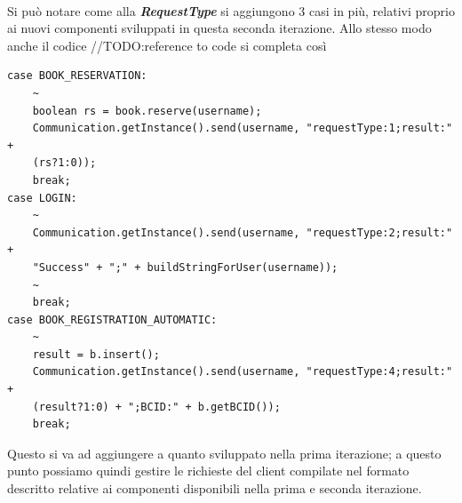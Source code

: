 \\ \noindent
Si può notare come alla \textbf{\textit{RequestType}} si aggiungono 3 casi in più, relativi proprio ai nuovi componenti sviluppati in questa seconda iterazione. Allo stesso modo anche il codice //TODO:reference to code si completa così
\begin{lstlisting}
case BOOK_RESERVATION:
	~
	boolean rs = book.reserve(username);
	Communication.getInstance().send(username, "requestType:1;result:" + 
	(rs?1:0));
	break;
case LOGIN:
	~
	Communication.getInstance().send(username, "requestType:2;result:" + 
	"Success" + ";" + buildStringForUser(username));
	~
	break;
case BOOK_REGISTRATION_AUTOMATIC:
	~
	result = b.insert();
	Communication.getInstance().send(username, "requestType:4;result:" + 
	(result?1:0) + ";BCID:" + b.getBCID());
	break;
\end{lstlisting}
Questo si va ad aggiungere a quanto sviluppato nella prima iterazione; a questo punto possiamo quindi gestire le richieste del client compilate nel formato descritto relative ai componenti disponibili nella prima e seconda iterazione.